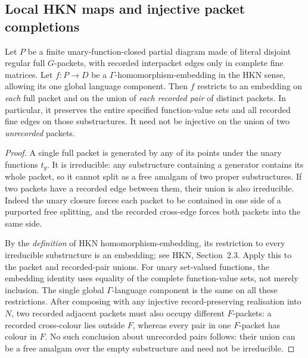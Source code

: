 \subsection{Local HKN maps and injective packet completions}

\begin{lemma}
\label{lem:hkn-irreducible-packet-control}
Let $P$ be a finite unary-function-closed partial diagram made of
literal disjoint regular full $G$-packets, with recorded interpacket
edges only in complete fine matrices.  Let $f:P\to D$ be a
$\Gamma$-homomorphism-embedding in the HKN sense, allowing its one
global language component.  Then $f$ restricts to an embedding on
\emph{each} full packet and on the union of \emph{each recorded pair}
of distinct packets.  In particular, it preserves the entire
specified function-value sets and all recorded fine edges on those
substructures.  It need not be injective on the union of two
\emph{unrecorded} packets.
\end{lemma}
\begin{proof}
A single full packet is generated by any of its points under the
unary functions $t_g$.  It is irreducible: any substructure
containing a generator contains its whole packet, so it cannot
split as a free amalgam of two proper substructures.  If two
packets have a recorded edge between them, their union is also
irreducible.  Indeed the unary closure forces each packet to be
contained in one side of a purported free splitting, and the
recorded cross-edge forces both packets into the same side.

By the \emph{definition} of HKN homomorphism-embedding, its
restriction to every irreducible substructure is an embedding;
see HKN, Section~2.3.  Apply this to the packet and recorded-pair
unions.  For unary set-valued functions, the embedding identity
uses equality of the complete function-value sets, not merely
inclusion.  The single global $\Gamma$-language component is the
same on all these restrictions.  After composing with any
injective record-preserving realisation into $N$, two recorded
adjacent packets must also occupy different $F$-packets: a
recorded cross-colour lies outside $F$, whereas every pair in
one $F$-packet has colour in $F$.  No such conclusion about
unrecorded pairs follows: their union can be a free amalgam over
the empty substructure and need not be irreducible.
\end{proof}

